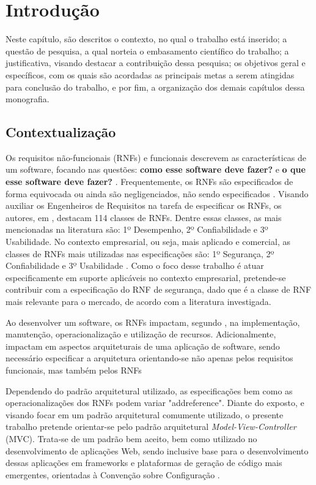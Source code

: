 \chapter{Introdução}

Neste capítulo, são descritos o contexto, no qual o trabalho está inserido; a questão de pesquisa, a qual norteia o embasamento científico do trabalho;  a justificativa, visando destacar a contribuição dessa pesquisa; os objetivos geral e específicos, com os quais são acordadas as principais metas a serem atingidas para conclusão do trabalho, e por fim, a organização dos demais capítulos dessa monografia.

\section{Contextualização}

Os requisitos não-funcionais (RNFs) e funcionais descrevem as características de um software, focando nas questões: \textbf{como esse software deve fazer?} e \textbf{o que esse software deve fazer?}  \cite{sommerville1997requirements} . Frequentemente, os RNFs são especificados de forma equivocada ou ainda são negligenciados, não sendo especificados \cite{eckhardt2016non}. Visando auxiliar os Engenheiros de Requisitos na tarefa de especificar os RNFs, os autores, em \cite{mairiza2010investigation}, destacam 114 classes de RNFs. Dentre essas classes, as mais mencionadas na literatura são: 1º Desempenho, 2º Confiabilidade e  3º Usabilidade. No contexto empresarial, ou seja, mais aplicado e comercial, as classes de RNFs mais utilizadas nas especificações são: 1º Segurança, 2º Confiabilidade e 3º Usabilidade \cite{eckhardt2016non}. Como o foco desse trabalho é atuar especificamente em suporte aplicáveis no contexto empresarial, pretende-se contribuir com a especificação do RNF de segurança, dado que é a classe de RNF mais relevante para o mercado, de acordo com a literatura investigada.

Ao desenvolver um software, os RNFs impactam, segundo \cite{eckhardt2016non}, na implementação, manutenção, operacionalização e utilização de recursos. Adicionalmente, impactam em aspectos arquiteturais de uma aplicação de software, sendo necessário especificar a arquitetura orientando-se não apenas pelos requisitos funcionais, mas também pelos RNFs \cite{buschmann1996system}

Dependendo do padrão arquitetural utilizado, as especificações bem como as operacionalizações dos RNFs podem variar "addreference". Diante do exposto, e visando focar em um padrão arquitetural comumente utilizado, o presente trabalho pretende orientar-se pelo padrão arquitetural \textit{Model-View-Controller} (MVC). Trata-se de um padrão bem aceito, bem como utilizado no desenvolvimento de aplicações Web, sendo inclusive base para o desenvolvimento dessas aplicações em frameworks e plataformas de geração de código mais emergentes, orientadas à Convenção sobre Configuração \cite{jailia2016behavior}.


